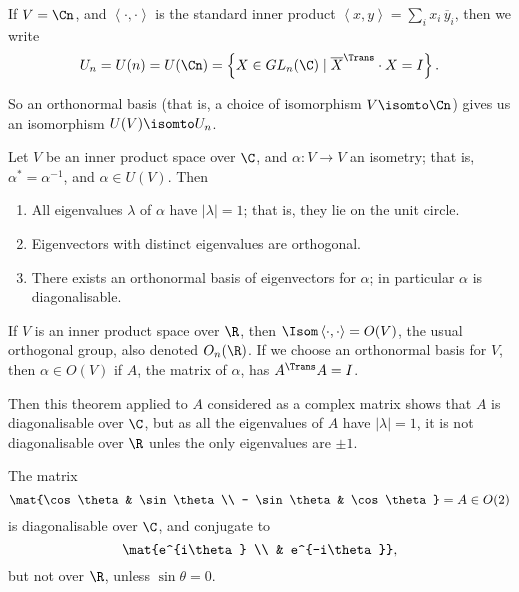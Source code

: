 If $V=\Cn$, and $\left\langle \cdot,\cdot \right\rangle$ is the standard inner product $\left\langle x,y \right\rangle = \sum_i x_i\,\overline{y}_i$, then we write
\begin{equation*}
	U_n = U(n) = U(\Cn)
	= \left\{X\in GL_n(\C) \mid \overline{X}^\Trans \cdot X = I \right\}.
\end{equation*}

So an orthonormal basis (that is, a choice of isomorphism $V\isomto \Cn$) gives us an isomorphism $U(V) \isomto U_n$.

\begin{theorem}
	Let $V$ be an inner product space over $\C$, and $\alpha:V\to V$ an isometry; that is, $\alpha^*=\alpha^{-1}$, and $\alpha\in U(V)$. Then \label{thm:eive-isometry} %
	\begin{enumerate}
		\shortskip
		\item All eigenvalues $\lambda$ of $\alpha$ have $\left\vert \lambda \right\vert=1$; that is, they lie on the unit circle. %
		\item Eigenvectors with distinct eigenvalues are orthogonal.
		\item There exists an orthonormal basis of eigenvectors for $\alpha$; in particular $\alpha$ is diagonalisable. %
	\end{enumerate}
\end{theorem}

\vspace{3pt}
\begin{remark}
	If $V$ is an inner product space over $\R$, then $\Isom\left\langle \cdot,\cdot \right\rangle=O(V)$, the usual orthogonal group,  also denoted $O_n(\R)$.  If we choose an orthonormal basis for $V$, then $\alpha\in O(V)$ if $A$, the matrix of $\alpha$, has $A^\Trans A=I$. %
	
	Then this theorem applied to $A$ considered as a complex matrix shows that $A$ is diagonalisable over $\C$, but as all the eigenvalues of $A$ have $\left\vert \lambda \right\vert=1$, it is not diagonalisable over $\R$ unles the only eigenvalues are $\pm 1$. %
\end{remark}

\begin{example}
	The matrix
	\begin{equation*}
		\mat{\cos\theta & \sin\theta \\ - \sin\theta & \cos\theta} = A\in O(2) %
	\end{equation*}
	is diagonalisable over $\C$, and conjugate to
	\begin{equation*}
		\mat{e^{i\theta} \\ & e^{-i\theta}},
	\end{equation*}
	but not over $\R$, unless $\sin\theta=0$. %
\end{example}

